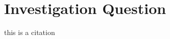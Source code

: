 \documentclass[twocolumn]{article} %
\begin{document}






\section{Investigation Question}

this is a citation \cite{Example}




\end{document}
